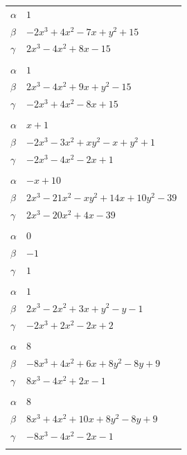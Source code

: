\documentclass[11pt]{article}
\begin{document}
\begin{longtable}{@{}ll@{}}
$\alpha$ & $1$\\
$\beta$ & $-2x^{3}+4x^{2}-7x+y^{2}+15$\\
$\gamma$ & $2x^{3}-4x^{2}+8x-15$\\
\addlinespace[3pt]
\multicolumn{2}{@{}l}{$\{i,j\}=\{2,15\}$, $k_{ij}=2^{5}$}\\
$\alpha$ & $1$\\
$\beta$ & $2x^{3}-4x^{2}+9x+y^{2}-15$\\
$\gamma$ & $-2x^{3}+4x^{2}-8x+15$\\
\addlinespace[3pt]
\multicolumn{2}{@{}l}{$\{i,j\}=\{2,26\}$, $k_{ij}=3$}\\
$\alpha$ & $x+1$\\
$\beta$ & $-2x^{3}-3x^{2}+xy^{2}-x+y^{2}+1$\\
$\gamma$ & $-2x^{3}-4x^{2}-2x+1$\\
\addlinespace[3pt]
\multicolumn{2}{@{}l}{$\{i,j\}=\{2,27\}$, $k_{ij}=2\cdot 7^{2}$}\\
$\alpha$ & $-x+10$\\
$\beta$ & $2x^{3}-21x^{2}-xy^{2}+14x+10y^{2}-39$\\
$\gamma$ & $2x^{3}-20x^{2}+4x-39$\\
\addlinespace[3pt]
\multicolumn{2}{@{}l}{$\{i,j\}=\{3,4\}$, $k_{ij}=2$}\\
$\alpha$ & $0$\\
$\beta$ & $-1$\\
$\gamma$ & $1$\\
\addlinespace[3pt]
\multicolumn{2}{@{}l}{$\{i,j\}=\{3,5\}$, $k_{ij}=3$}\\
$\alpha$ & $1$\\
$\beta$ & $2x^{3}-2x^{2}+3x+y^{2}-y-1$\\
$\gamma$ & $-2x^{3}+2x^{2}-2x+2$\\
\addlinespace[3pt]
\multicolumn{2}{@{}l}{$\{i,j\}=\{3,16\}$, $k_{ij}=3^{2}$}\\
$\alpha$ & $8$\\
$\beta$ & $-8x^{3}+4x^{2}+6x+8y^{2}-8y+9$\\
$\gamma$ & $8x^{3}-4x^{2}+2x-1$\\
\addlinespace[3pt]
\multicolumn{2}{@{}l}{$\{i,j\}=\{3,17\}$, $k_{ij}=3^{2}$}\\
$\alpha$ & $8$\\
$\beta$ & $8x^{3}+4x^{2}+10x+8y^{2}-8y+9$\\
$\gamma$ & $-8x^{3}-4x^{2}-2x-1$\\
\addlinespace[3pt]
\multicolumn{2}{@{}l}{$\{i,j\}=\{3,18\}$, $k_{ij}=3$}\\

\end{longtable}
\end{document}
